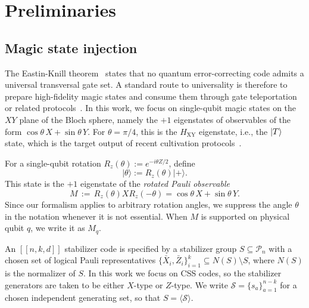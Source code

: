 \section{Preliminaries}
\label{sec:background}




\subsection{Magic state injection}

The Eastin-Knill theorem~\cite{eastin_restrictions_2009} states that no quantum error-correcting code admits a universal transversal gate set.
A standard route to universality is therefore to prepare high-fidelity magic states and consume them through gate teleportation or related protocols~\cite{litinski_game_2019,litinski_magic_2019}.
In this work, we focus on single-qubit magic states on the $XY$ plane of the Bloch sphere, namely the $+1$ eigenstates of observables of the form $\cos\theta\,X+\sin\theta\,Y$.
For $\theta=\pi/4$, this is the $H_{\mathrm{XY}}$ eigenstate, i.e., the $\ket{T}$ state, which is the target output of recent cultivation protocols~\cite{gidney_magic_2024,sahay_fold-transversal_2025,chen_efficient_2025-1}.

For a single-qubit rotation $R_z(\theta):=e^{-i\theta Z/2}$, define
\begin{equation}
|\theta\rangle := R_z(\theta)|+\rangle.
\end{equation}
This state is the $+1$ eigenstate of the \emph{rotated Pauli observable}~\cite{li_magic_2015}
\begin{equation}
M \, := \, R_z(\theta) X R_z(-\theta)
= \cos\theta\,X + \sin\theta\,Y.
\label{eq:single-qubit-magic-op}
\end{equation}
Since our formalism applies to arbitrary rotation angles, we suppress the angle $\theta$ in the notation whenever it is not essential.
When $M$ is supported on physical qubit $q$, we write it as $M_q$.

An $[[n,k,d]]$ stabilizer code is specified by a stabilizer group $S \subseteq \mathcal{P}_n$ with a chosen set of logical Pauli representatives $\{\bar X_i,\bar Z_i\}_{i=1}^k \subseteq N(S)\setminus S$, where $N(S)$ is the normalizer of $S$.
In this work we focus on CSS codes, so the stabilizer generators are taken to be either $X$-type or $Z$-type.
We write $\mathcal{S}=\{s_a\}_{a=1}^{n-k}$ for a chosen independent generating set, so that $S=\langle \mathcal{S}\rangle$.

